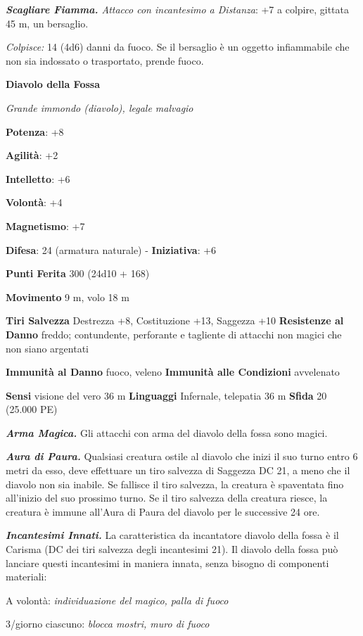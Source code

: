 \begin{multicols}{2}
\emph{\textbf{Scagliare Fiamma.} Attacco con incantesimo a Distanza}: +7
a colpire, gittata 45 m, un bersaglio.

\emph{Colpisce:} 14 (4d6) danni da fuoco. Se il bersaglio è un oggetto
infiammabile che non sia indossato o trasportato, prende fuoco.

\textbf{Diavolo della Fossa}

\emph{Grande immondo (diavolo), legale malvagio}

\textbf{Potenza}: +8

\textbf{Agilità}: +2

\textbf{Intelletto}: +6

\textbf{Volontà}: +4

\textbf{Magnetismo}: +7

\textbf{Difesa}: 24 (armatura naturale) - \textbf{Iniziativa}: +6

\textbf{Punti Ferita} 300 (24d10 + 168)

\textbf{Movimento} 9 m, volo 18 m

\textbf{Tiri Salvezza} Destrezza +8, Costituzione +13, Saggezza +10
\textbf{Resistenze al Danno} freddo; contundente, perforante e tagliente
di attacchi non magici che non siano argentati

\textbf{Immunità al Danno} fuoco, veleno \textbf{Immunità alle
Condizioni} avvelenato

\textbf{Sensi} visione del vero 36 m
\textbf{Linguaggi} Infernale, telepatia 36 m \textbf{Sfida} 20 (25.000
PE)

\emph{\textbf{Arma Magica.}} Gli attacchi con arma del diavolo della
fossa sono magici.

\emph{\textbf{Aura di Paura.}} Qualsiasi creatura ostile al diavolo che
inizi il suo turno entro 6 metri da esso, deve effettuare un tiro
salvezza di Saggezza DC 21, a meno che il diavolo non sia inabile. Se
fallisce il tiro salvezza, la creatura è spaventata fino all'inizio del
suo prossimo turno. Se il tiro salvezza della creatura riesce, la
creatura è immune all'Aura di Paura del diavolo per le successive 24
ore.

\emph{\textbf{Incantesimi Innati.}} La caratteristica da incantatore
diavolo della fossa è il Carisma (DC dei tiri salvezza degli incantesimi
21). Il diavolo della fossa può lanciare questi incantesimi in maniera
innata, senza bisogno di componenti materiali:

A volontà: \emph{individuazione del magico, palla di fuoco}

3/giorno ciascuno: \emph{blocca mostri, muro di fuoco}


\end{multicols}
